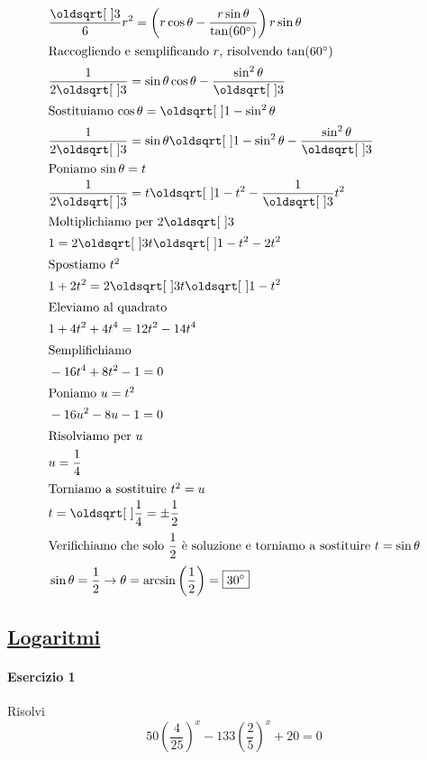 \begin{align*}
&\frac{\sqrt{3}}{6}r^2 = \left(r\cos\theta - \frac{r\sin\theta}{\tan(\ang{60})}\right)r\sin\theta\\
\intertext{Raccogliendo e semplificando $r$, risolvendo $\tan(\ang{60})$}
&\frac{1}{2\sqrt{3}} = \sin\theta\cos\theta -\frac{\sin^2\theta}{\sqrt{3}}\\
\intertext{Sostituiamo $\cos\theta = \sqrt{1-\sin^2\theta}$}
&\frac{1}{2\sqrt{3}} = \sin\theta\sqrt{1-\sin^2\theta}-\frac{\sin^2\theta}{\sqrt{3}}\\
\intertext{Poniamo $\sin\theta = t$}
&\frac{1}{2\sqrt{3}} = t\sqrt{1-t^2}-\frac{1}{\sqrt{3}}t^2\\
\intertext{Moltiplichiamo per $2\sqrt{3}$}
&1 = 2\sqrt{3}t\sqrt{1-t^2}-2t^2\\
\intertext{Spostiamo $t^2$}
&1+2t^2 = 2\sqrt{3}t\sqrt{1-t^2}\\
\intertext{Eleviamo al quadrato}
&1+4t^2+4t^4 = 12t^2-14t^4\\
\intertext{Semplifichiamo}
&-16t^4+8t^2-1=0\\
\intertext{Poniamo $u = t^2$}
&-16u^2-8u-1=0\\
\intertext{Risolviamo per $u$}
&u = \frac{1}{4}\\
\intertext{Torniamo a sostituire $t^2=u$}
&t = \sqrt{\frac{1}{4}} = \pm\frac{1}{2}\\
\intertext{Verifichiamo che solo $\dfrac{1}{2}$ è soluzione e torniamo a sostituire $t = \sin\theta$}
&\sin\theta = \frac{1}{2} \rightarrow \theta = \arcsin\left(\frac{1}{2}\right) = \boxed{\ang{30}}
\end{align*}

\subsection*{\hyperref[sec:logaritmi]{Logaritmi}}\label{ex:logaritmi}
\paragraph{Esercizio 1}
Risolvi
\begin{equation*}
50\left(\frac{4}{25}\right)^x-133\left(\frac{2}{5}\right)^x+20=0
\end{equation*}
\divisor


